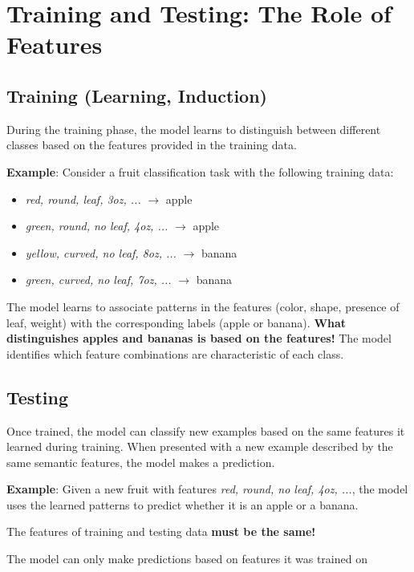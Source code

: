 \documentclass[11pt,a4paper]{article}
\theoremstyle{definition}
\theoremstyle{plain}
\theoremstyle{remark}
\begin{document}
\section{Training and Testing: The Role of Features}

\subsection{Training (Learning, Induction)}

During the training phase, the model learns to distinguish between different classes based on the features provided in the training data. 

\textbf{Example}: Consider a fruit classification task with the following training data:
\begin{itemize}
    \item \textit{red, round, leaf, 3oz, ...} $\rightarrow$ apple
    \item \textit{green, round, no leaf, 4oz, ...} $\rightarrow$ apple
    \item \textit{yellow, curved, no leaf, 8oz, ...} $\rightarrow$ banana
    \item \textit{green, curved, no leaf, 7oz, ...} $\rightarrow$ banana
\end{itemize}

The model learns to associate patterns in the features (color, shape, presence of leaf, weight) with the corresponding labels (apple or banana). \textbf{What distinguishes apples and bananas is based on the features!} The model identifies which feature combinations are characteristic of each class.

\subsection{Testing}

Once trained, the model can classify new examples based on the same features it learned during training. When presented with a new example described by the same semantic features, the model makes a prediction.

\textbf{Example}: Given a new fruit with features \textit{red, round, no leaf, 4oz, ...}, the model uses the learned patterns to predict whether it is an apple or a banana.

\begin{tcolorbox}[colback=red!5!white,colframe=red!75!black,title=\textbf{Critical Assumption}]
\begin{center}
The features of training and testing data \textbf{must be the same!}

The model can only make predictions based on features it was trained on
\end{center}
\end{tcolorbox}
\end{document}
